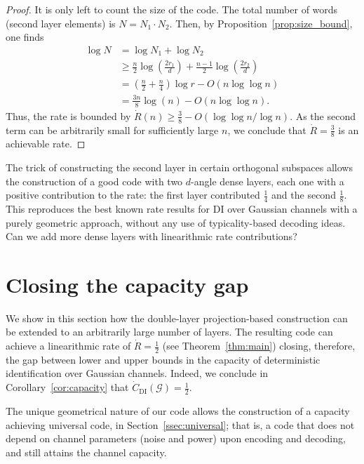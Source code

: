 \documentclass[10pt,conference]{IEEEtran}
\newcommand{\1}{\mathds{1}}
\newcommand{\cG}{\mathcal{G}}
\begin{document}
\begin{proof}
It is only left to count the size of the code. The total number of words (second layer elements) is $N=N_1\cdot N_2$. Then, by Proposition~\ref{prop:size_bound}, one finds
\begin{equation}
\begin{split}
\log N&=\log N_1+\log N_2\\
&\geq\frac{n}{2}\log\left(\frac{2r_1}{d}\right)+\frac{n-1}{2}\log\left(\frac{2r_2}{d}\right)\\
&=\left(\frac{n}{2}+\frac{n}{4}\right)\log r-O(n\log \log n)\\
&=\frac{3n}{8}\log(n)-O(n\log\log n).
\end{split}
\end{equation}
Thus, the rate is bounded by $\dot R(n)\geq\frac38-O(\log\log n/\log n)$. As the second term can be arbitrarily small for sufficiently large $n$, we conclude that $\dot R=\frac 38$ is an achievable rate.
\end{proof}

The trick of constructing the second layer in certain orthogonal subspaces allows the construction of a good code with two $d$-angle dense layers, each one with a positive contribution to the rate: the first layer contributed $\frac14$ and the second $\frac18$. This reproduces the best known rate results for DI over Gaussian channels with a purely geometric approach, without any use of typicality-based decoding ideas. Can we add more dense layers with linearithmic rate contributions?










\section{Closing the capacity gap}\label{sec:main_results}
We show in this section how the double-layer projection-based construction can be extended to an arbitrarily large number of layers. The resulting code can achieve a linearithmic rate of $\dot R=\frac12$ (see Theorem~\ref{thm:main}) closing, therefore, the gap between lower and upper bounds in the capacity of deterministic identification over Gaussian channels. Indeed, we conclude in Corollary~\ref{cor:capacity} that $\dot C_\text{DI}(\cG)=\frac12$. 

The unique geometrical nature of our code allows the construction of a capacity achieving universal code, in Section~\ref{ssec:universal}; that is, a code that does not depend on channel parameters (noise and power) upon encoding and decoding, and still attains the channel capacity.
\end{document}
